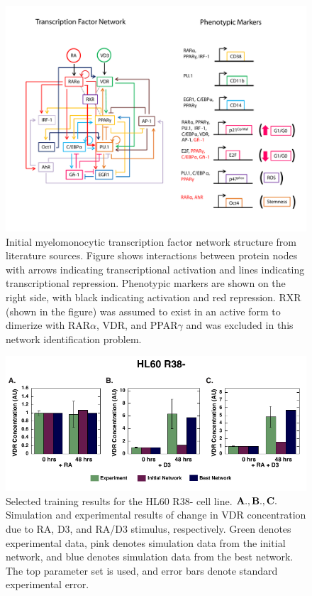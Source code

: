 \documentclass[12pt]{article}
\begin{document}
\begin{figure}\centering
\includegraphics[width=1.0\textwidth]{./figs_chp3/TF_Network_new.pdf}
\caption{Initial myelomonocytic transcription factor network structure from literature sources. Figure shows interactions between protein nodes with arrows indicating transcriptional activation and lines indicating transcriptional repression. Phenotypic markers are shown on the right side, with black indicating activation and red repression. RXR (shown in the figure) was assumed to exist in an active form to dimerize with RAR$\alpha$, VDR, and PPAR$\gamma$ and was excluded in this network identification problem.}
\label{fg:Initial_TF_Network}
\end{figure}

\clearpage

\clearpage

\clearpage

\begin{figure}\centering
\includegraphics[width=1.0\textwidth]{./figs_chp3/Cell_Line_New/R38-HL60_Experiment_6.pdf}
\caption{Selected training results for the HL60 R38- cell line. $\bf{A., B., C.}$ Simulation and experimental results of change in VDR concentration due to RA, D3, and RA/D3 stimulus, respectively. Green denotes experimental data, pink denotes simulation data from the initial network, and blue denotes simulation data from the best network. The top parameter set is used, and error bars denote standard experimental error.}
\label{fg:R38-HL60_Experiment}
\end{figure}
\clearpage
\end{document}
